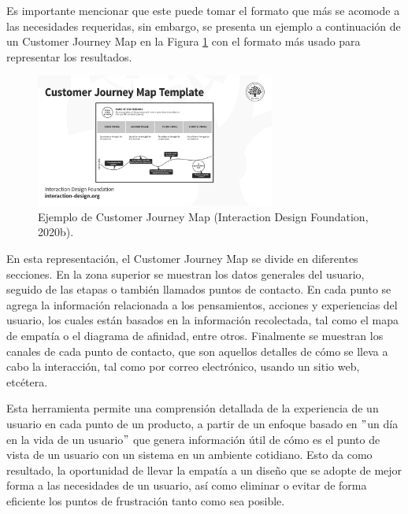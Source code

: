 Es importante mencionar que este puede tomar el formato que más se acomode a las necesidades requeridas, sin embargo, se presenta un ejemplo a continuación de un Customer Journey Map en la Figura \ref{fig:35} con el formato más usado para representar los resultados.

\begin{figure}[H]
  \centering
  \includegraphics[width=0.70\textwidth]{Cap3/Figuras/CustomerJourneyMapEjemplo.png}
  \caption{Ejemplo de Customer Journey Map (Interaction Design Foundation, 2020b).}
  \label{fig:35}
\end{figure}

En esta representación, el Customer Journey Map se divide en diferentes secciones. En la zona superior se muestran los datos generales del usuario, seguido de las etapas o también llamados puntos de contacto. En cada punto se agrega la información relacionada a los pensamientos, acciones y experiencias del usuario, los cuales están basados en la información recolectada, tal como el mapa de empatía o el diagrama de afinidad, entre otros. Finalmente se muestran los canales de cada punto de contacto, que son aquellos detalles de cómo se lleva a cabo la interacción, tal como por correo electrónico, usando un sitio web, etcétera.

Esta herramienta permite una comprensión detallada de la experiencia de un usuario en cada punto de un producto, a partir de un enfoque basado en $"$un día en la vida de un usuario$"$ que genera información útil de cómo es el punto de vista de un usuario con un sistema en un ambiente cotidiano. Esto da como resultado, la oportunidad de llevar la empatía a un diseño que se adopte de mejor forma a las necesidades de un usuario, así como eliminar o evitar de forma eficiente los puntos de frustración tanto como sea posible.



